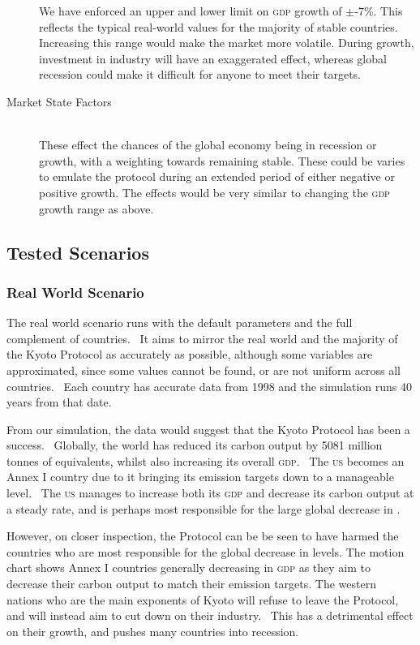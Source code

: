 \begin{description}
We have enforced an upper and lower limit on \textsc{gdp} growth of $\pm$-7\%. This reflects the typical real-world values for the majority of stable countries. Increasing this range would make the market more volatile. During growth, investment in industry will have an exaggerated effect, whereas global recession could make it difficult for anyone to meet their targets.

\item[Market State Factors] \hfill \\

These effect the chances of the global economy being in recession or growth, with a weighting towards remaining stable. These could be varies to emulate the protocol during an extended period of either negative or positive growth. The effects would be very similar to changing the \textsc{gdp} growth range as above.
\end{description}

\subsection{Tested Scenarios}

%
%

\subsubsection{Real World Scenario}

The real world scenario runs with the default parameters and the full complement of countries.  It aims to mirror the real world and the majority of the Kyoto Protocol as accurately as possible, although some variables are approximated, since some values cannot be found, or are not uniform across all countries.  Each country has accurate data from 1998 and the simulation runs 40 years from that date.

From our simulation, the data would suggest that the Kyoto Protocol has been a success.  Globally, the world has reduced its carbon output by 5081 million tonnes of \CO equivalents, whilst also increasing its overall \textsc{gdp}.  The \textsc{us} becomes an Annex I country due to it bringing its emission targets down to a manageable level.  The \textsc{us} manages to increase both its \textsc{gdp} and decrease its carbon output at a steady rate, and is perhaps most responsible for the large global decrease in \CO.

However, on closer inspection, the Protocol can be be seen to have harmed the countries who are most responsible for the global decrease in \CO levels. The motion chart shows Annex I countries generally decreasing in \textsc{gdp} as they aim to decrease their carbon output to match their emission targets. The western nations who are the main exponents of Kyoto will refuse to leave the Protocol, and will instead aim to cut down on their industry.  This has a detrimental effect on their growth, and pushes many countries into recession.

